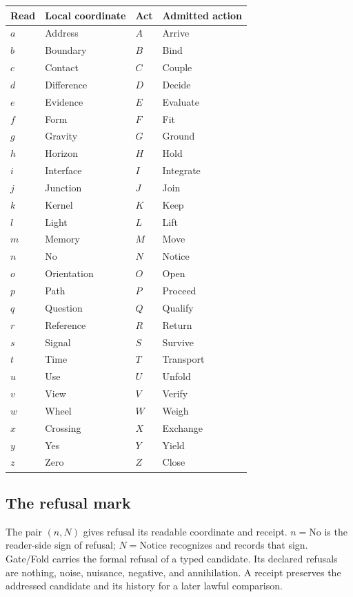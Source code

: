 \documentclass[11pt]{article}
\begin{document}
\begin{longtable}{p{}p{}p{}p{}}
\toprule
\textbf{Read} & \textbf{Local coordinate} & \textbf{Act} & \textbf{Admitted action}\\
\midrule
\endhead
\bottomrule
\endfoot
$a$ & Address & $A$ & Arrive\\
$b$ & Boundary & $B$ & Bind\\
$c$ & Contact & $C$ & Couple\\
$d$ & Difference & $D$ & Decide\\
$e$ & Evidence & $E$ & Evaluate\\
$f$ & Form & $F$ & Fit\\
$g$ & Gravity & $G$ & Ground\\
$h$ & Horizon & $H$ & Hold\\
$i$ & Interface & $I$ & Integrate\\
$j$ & Junction & $J$ & Join\\
$k$ & Kernel & $K$ & Keep\\
$l$ & Light & $L$ & Lift\\
$m$ & Memory & $M$ & Move\\
$n$ & No & $N$ & Notice\\
$o$ & Orientation & $O$ & Open\\
$p$ & Path & $P$ & Proceed\\
$q$ & Question & $Q$ & Qualify\\
$r$ & Reference & $R$ & Return\\
$s$ & Signal & $S$ & Survive\\
$t$ & Time & $T$ & Transport\\
$u$ & Use & $U$ & Unfold\\
$v$ & View & $V$ & Verify\\
$w$ & Wheel & $W$ & Weigh\\
$x$ & Crossing & $X$ & Exchange\\
$y$ & Yes & $Y$ & Yield\\
$z$ & Zero & $Z$ & Close\\
\end{longtable}

\subsection{The refusal mark}
The pair $(n,N)$ gives refusal its readable coordinate and receipt. $n=\text{No}$ is the reader-side sign of refusal; $N=\text{Notice}$ recognizes and records that sign. Gate/Fold carries the formal refusal of a typed candidate. Its declared refusals are nothing, noise, nuisance, negative, and annihilation. A receipt preserves the addressed candidate and its history for a later lawful comparison.
\end{document}
